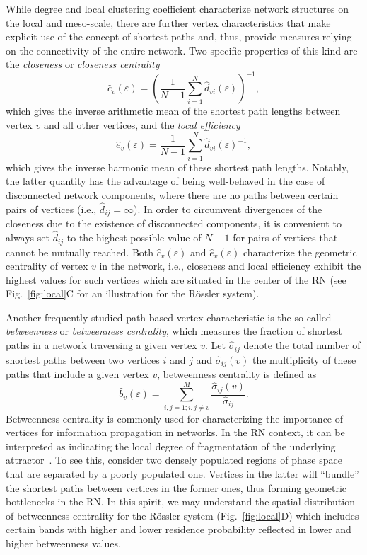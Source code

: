 \documentclass[graybox]{svmult}
\begin{document}
While degree and local clustering coefficient characterize network structures on the local and meso-scale, there are further vertex characteristics that make explicit use of the concept of shortest paths and, thus, provide measures relying on the connectivity of the entire network. Two specific properties of this kind are the \textit{closeness} or \textit{closeness centrality}
\begin{equation}
\hat{c}_v(\varepsilon)=\left(\frac{1}{N-1}\sum_{i=1}^N \hat{d}_{vi}(\varepsilon) \right)^{-1},
\label{eq:closeness}
\end{equation}
\noindent
which gives the inverse arithmetic mean of the shortest path lengths between vertex $v$ and all other vertices, and the \textit{local efficiency}
\begin{equation}
\hat{e}_v(\varepsilon)=\frac{1}{N-1}\sum_{i=1}^N \hat{d}_{vi}(\varepsilon)^{-1},
\label{eq:locefficiency}
\end{equation}
\noindent
which gives the inverse harmonic mean of these shortest path lengths. Notably, the latter quantity has the advantage of being well-behaved in the case of disconnected network components, where there are no paths between certain pairs of vertices (i.e., $\hat{d}_{ij}=\infty$). In order to circumvent divergences of the closeness due to the existence of disconnected components, it is convenient to always set $\hat{d}_{ij}$ to the highest possible value of $N-1$ for pairs of vertices that cannot be mutually reached. Both $\hat{c}_v(\varepsilon)$ and $\hat{e}_v(\varepsilon)$ characterize the geometric centrality of vertex $v$ in the network, i.e., closeness and local efficiency exhibit the highest values for such vertices which are situated in the center of the RN (see Fig.~\ref{fig:local}C for an illustration for the R\"ossler system).

Another frequently studied path-based vertex characteristic is the so-called \textit{betweenness} or \textit{betweenness centrality}, which measures the fraction of shortest paths in a network traversing a given vertex $v$. Let $\hat{\sigma}_{ij}$ denote the total number of shortest paths between two vertices $i$ and $j$ and $\hat{\sigma}_{ij}(v)$ the multiplicity of these paths that include a given vertex $v$, betweenness centrality is defined as
\begin{equation}
\hat{b}_v(\varepsilon)=\sum_{i,j=1; i,j\neq v}^M \frac{\hat{\sigma}_{ij}(v)}{\hat{\sigma}_{ij}}.
\label{eq:betweenness}
\end{equation}
\noindent
Betweenness centrality is commonly used for characterizing the importance of vertices for information propagation in networks. In the RN context, it can be interpreted as indicating the local degree of fragmentation of the underlying attractor~\cite{Donner2010NJP}. To see this, consider two densely populated regions of phase space that are separated by a poorly populated one. Vertices in the latter will ``bundle'' the shortest paths between vertices in the former ones, thus forming geometric bottlenecks in the RN. In this spirit, we may understand the spatial distribution of betweenness centrality for the R\"ossler system (Fig.~\ref{fig:local}D) which includes certain bands with higher and lower residence probability reflected in lower and higher betweenness values.
\end{document}

